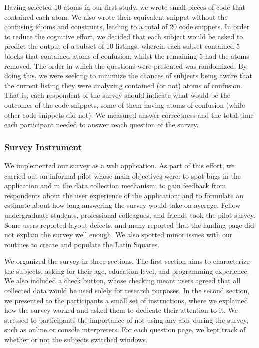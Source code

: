 Having selected 10 atoms in our first study, we wrote small pieces of code that contained each atom. We also wrote their equivalent snippet without the confusing idioms and constructs, leading to a total of 20 code snippets. In order to reduce the cognitive effort, we decided that each subject would be asked to predict the output of a subset of 10 listings, wherein each subset contained 5 blocks that contained atoms of confusion, whilst the remaining 5 had the atoms removed. The order in which the questions were presented was randomized. By doing this, we were seeking to minimize the chances of subjects being aware that the current listing they were analyzing contained (or not) atoms of confusion.
That is, each respondent of the survey should indicate what would be the outcomes of the code snippets, some of them having atoms of confusion (while other code snippets did not). 
We measured answer correctness and the total time each participant needed to answer reach question of the survey. 

\subsubsection{Survey Instrument} 

We implemented our survey as a web application. As part of this 
effort, we carried out an informal pilot whose main objectives were: to spot bugs in the application and in the data collection mechanism; to gain feedback from respondents about the user experience of the application; and to formulate an estimate about how long answering the survey would take on average. Fellow undergraduate students, professional colleagues, and friends took the pilot survey. Some users reported layout defects, and many reported that the landing page did not explain the survey well enough. We also spotted minor issues with our routines to create and populate the Latin Squares. 

We organized the survey in {\color{red}three} sections. The first section aims to characterize the subjects, asking for their age, education level, and programming experience. We also included a check button, whose checking meant users agreed that all collected data would be used solely for research purposes. In the second section, we presented to the participants a small set of instructions, where we explained how the survey worked and asked them to dedicate their attention to it. We stressed to participants the importance of not using any aids during the survey, such as online or console interpreters. For each question page, we kept track of whether or not the subjects switched windows. 

